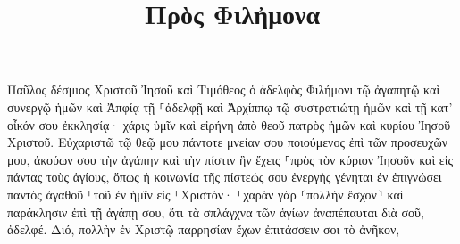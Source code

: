 \documentclass{openreader}
\title{Πρὸς Φιλἠμονα}
\date{}
\begin{document}
\maketitle
\raggedbottom 
\fontsize{16pt}{24pt}\selectfont


Παῦλος δέσμιος Χριστοῦ Ἰησοῦ καὶ Τιμόθεος ὁ ἀδελφὸς Φιλήμονι τῷ ἀγαπητῷ καὶ συνεργῷ ἡμῶν 
καὶ Ἀπφίᾳ τῇ ⸀ἀδελφῇ καὶ Ἀρχίππῳ τῷ συστρατιώτῃ ἡμῶν καὶ τῇ κατ’ οἶκόν σου ἐκκλησίᾳ· 
χάρις ὑμῖν καὶ εἰρήνη ἀπὸ θεοῦ πατρὸς ἡμῶν καὶ κυρίου Ἰησοῦ Χριστοῦ. 
Εὐχαριστῶ τῷ θεῷ μου πάντοτε μνείαν σου ποιούμενος ἐπὶ τῶν προσευχῶν μου, 
ἀκούων σου τὴν ἀγάπην καὶ τὴν πίστιν ἣν ἔχεις ⸀πρὸς τὸν κύριον Ἰησοῦν καὶ εἰς πάντας τοὺς ἁγίους, 
ὅπως ἡ κοινωνία τῆς πίστεώς σου ἐνεργὴς γένηται ἐν ἐπιγνώσει παντὸς ἀγαθοῦ ⸀τοῦ ἐν ἡμῖν εἰς ⸀Χριστόν· 
⸀χαρὰν γὰρ ⸂πολλὴν ἔσχον⸃ καὶ παράκλησιν ἐπὶ τῇ ἀγάπῃ σου, ὅτι τὰ σπλάγχνα τῶν ἁγίων ἀναπέπαυται διὰ σοῦ, ἀδελφέ. 
Διό, πολλὴν ἐν Χριστῷ παρρησίαν ἔχων ἐπιτάσσειν σοι τὸ ἀνῆκον, 
\end{document}
